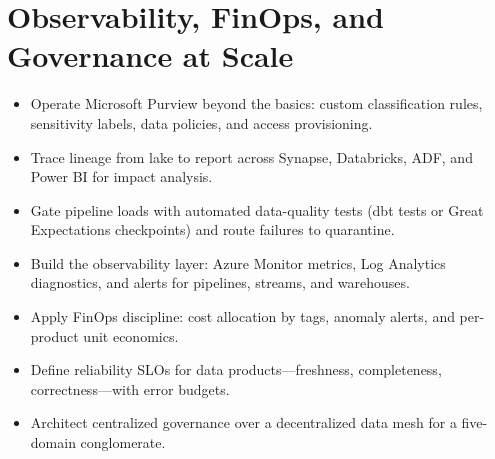 \chapter{Observability, FinOps, and Governance at Scale}
%
\begin{objectives}
\begin{itemize}
    \item Operate Microsoft Purview beyond the basics: custom classification rules, sensitivity labels, data policies, and access provisioning.
    \item Trace lineage from lake to report across Synapse, Databricks, ADF, and Power BI for impact analysis.
    \item Gate pipeline loads with automated data-quality tests (dbt tests or Great Expectations checkpoints) and route failures to quarantine.
    \item Build the observability layer: Azure Monitor metrics, Log Analytics diagnostics, and alerts for pipelines, streams, and warehouses.
    \item Apply FinOps discipline: cost allocation by tags, anomaly alerts, and per-product unit economics.
    \item Define reliability SLOs for data products---freshness, completeness, correctness---with error budgets.
    \item Architect centralized governance over a decentralized data mesh for a five-domain conglomerate.
\end{itemize}
\end{objectives}


